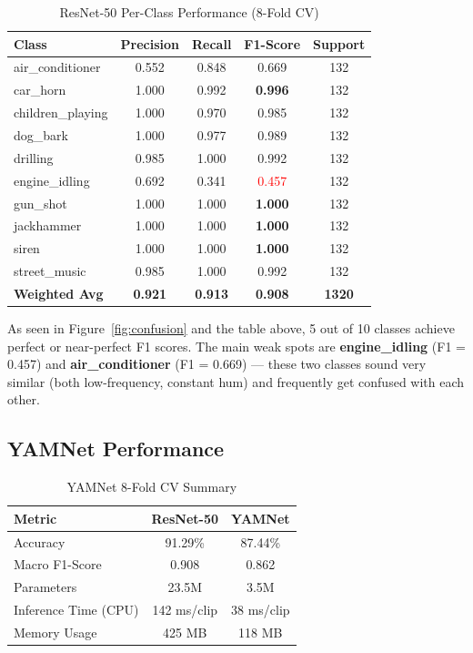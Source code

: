 \documentclass[11pt,a4paper]{article}
\begin{document}
\begin{table}[H]
\centering
\small
\caption{ResNet-50 Per-Class Performance (8-Fold CV)}
\begin{tabular}{lcccc}
\toprule
\textbf{Class} & \textbf{Precision} & \textbf{Recall} & \textbf{F1-Score} & \textbf{Support} \\
\midrule
air\_conditioner & 0.552 & 0.848 & 0.669 & 132 \\
car\_horn & 1.000 & 0.992 & \textbf{0.996} & 132 \\
children\_playing & 1.000 & 0.970 & 0.985 & 132 \\
dog\_bark & 1.000 & 0.977 & 0.989 & 132 \\
drilling & 0.985 & 1.000 & 0.992 & 132 \\
engine\_idling & 0.692 & 0.341 & \textcolor{red}{0.457} & 132 \\
gun\_shot & 1.000 & 1.000 & \textbf{1.000} & 132 \\
jackhammer & 1.000 & 1.000 & \textbf{1.000} & 132 \\
siren & 1.000 & 1.000 & \textbf{1.000} & 132 \\
street\_music & 0.985 & 1.000 & 0.992 & 132 \\
\midrule
\textbf{Weighted Avg} & \textbf{0.921} & \textbf{0.913} & \textbf{0.908} & \textbf{1320} \\
\bottomrule
\end{tabular}
\end{table}

As seen in Figure~\ref{fig:confusion} and the table above, 5 out of 10 classes achieve perfect or near-perfect F1 scores. The main weak spots are \textbf{engine\_idling} (F1 = 0.457) and \textbf{air\_conditioner} (F1 = 0.669) — these two classes sound very similar (both low-frequency, constant hum) and frequently get confused with each other.

\subsection{YAMNet Performance}

\begin{table}[H]
\centering
\small
\caption{YAMNet 8-Fold CV Summary}
\begin{tabular}{lcc}
\toprule
\textbf{Metric} & \textbf{ResNet-50} & \textbf{YAMNet} \\
\midrule
Accuracy & 91.29\% & 87.44\% \\
Macro F1-Score & 0.908 & 0.862 \\
Parameters & 23.5M & 3.5M \\
Inference Time (CPU) & 142 ms/clip & 38 ms/clip \\
Memory Usage & 425 MB & 118 MB \\
\bottomrule
\end{tabular}
\end{table}
\end{document}
